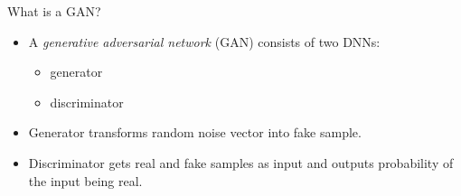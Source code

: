 \begin{frame} {What is a GAN?}
    \begin{figure}
    \centering
    \end{figure}
    \begin{itemize}
    \item A  \emph{generative adversarial network} (GAN)  consists of two DNNs:
    \begin{itemize}
    \item generator 
    \item discriminator
    \end{itemize}
    \item Generator transforms random noise vector into fake sample. %
    \item Discriminator gets real and fake samples  as input and outputs %
    probability of the input being real.
    \end{itemize}
    \end{frame}
    
